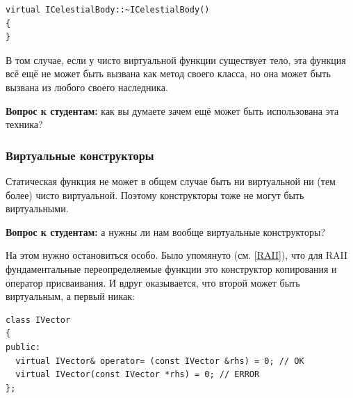 \documentclass[a4paper,12pt,oneside]{article}
\newif\ifanswers
\begin{document}
\begin{lstlisting}
virtual ICelestialBody::~ICelestialBody()
{
}
\end{lstlisting}

В том случае, если у чисто виртуальной функции существует тело, эта функция всё ещё не может быть вызвана как метод своего класса, но она может быть вызвана из любого своего наследника.

\textbf{Вопрос к студентам:} как вы думаете зачем ещё может быть использована эта техника?

\ifanswers
Возможный ответ: для организации разумного поведения по умолчанию, которое наследники должны явно вызывать:

\begin{lstlisting}
class B 
{
public:
  virtual bool f() = 0;
};

bool 
B::f() 
{
  return true;  // this is a good default, but
}               // shouldn't be used blindly

class D : public B 
{
public:
  bool f() 
  {
    return B::f(); // if D wants the default
  }                // behaviour, it has to say so
};
\end{lstlisting}

Но тут возможны и другие варианты: например выдать лучшее сообщение об ошибке чем компилятор и выйти.
\fi

\subsubsection{Виртуальные конструкторы}\label{VirtCtors}

Статическая функция не может в общем случае быть ни виртуальной ни (тем более) чисто виртуальной. Поэтому конструкторы тоже не могут быть виртуальными.

\textbf{Вопрос к студентам:} а нужны ли нам вообще виртуальные конструкторы?

\ifanswers
Правильный ответ: да очень нужны. Скажем виртуальный конструктор копирования позволил бы создать в явном виде объект производного класса по указателю на объект базового класса
\fi

На этом нужно остановиться особо. Было упомянуто (см. \ref{RAII}), что для RAII фундаментальные переопределяемые функции это конструктор копирования и оператор присваивания. И вдруг оказывается, что второй может быть виртуальным, а первый никак:

\begin{lstlisting}
class IVector
{
public:
  virtual IVector& operator= (const IVector &rhs) = 0; // OK
  virtual IVector(const IVector *rhs) = 0; // ERROR
};
\end{lstlisting}
\end{document}
